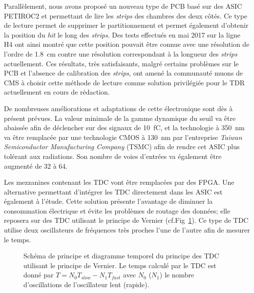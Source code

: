 Parallèlement, nous avons proposé un nouveau type de PCB basé sur des ASIC PETIROC2 et permettant de lire les \textit{strips} des chambres des deux côtés. Ce type de lecture permet de supprimer le partitionnement et permet également d'obtenir la position du \textit{hit} le long des \textit{strips}. Des tests effectués en mai \num{2017} sur la ligne H4 ont ainsi montré que cette position pouvait être connue avec une résolution de l'ordre de \SI{1.8}{\centi\meter} contre une résolution correspondant à la longueur des \textit{strips} actuellement. Ces résultats, très satisfaisants, malgré certains problèmes sur le PCB et l'absence de calibration des \textit{strips}, ont amené la communauté muons de CMS à choisir cette méthode de lecture comme solution privilégiée pour le TDR actuellement en cours de rédaction.

De nombreuses améliorations et adaptations de cette électronique sont dès à présent prévues. La valeur minimale de la gamme dynamique du seuil va être abaissée afin de déclencher sur des signaux de \SI{10}{\femto\coulomb}, et la technologie  à \SI{350}{\nano\meter} va être remplacée par une technologie CMOS à \SI{130}{\nano\meter} par l'entreprise \textit{Taiwan Semiconductor Manufacturing Company} (TSMC) afin de rendre cet ASIC plus tolérant aux radiations. Son nombre de voies d'entrées va également être augmenté de \num{32} à \num{64}.

Les mezzanines contenant les TDC vont être remplacées par des FPGA. Une alternative permettant d'intégrer les TDC directement dans les ASIC est également à l'étude. Cette solution présente l'avantage de diminuer la consommation électrique et évite les problèmes de routage des données; elle reposera sur des TDC utilisant le principe de Vernier (cf.Fig~\ref{vernier}). Ce type de TDC utilise deux oscillateurs de fréquences très proches l'une de l'autre afin de mesurer le temps.

\begin{figure}[ht!]
	\centering
	\hfill
	\caption{Schéma de principe et diagramme temporel du principe des TDC utilisant le principe de Vernier. Le temps calculé par le TDC est donné par $T=N_0T_{slow}-N_1T_{fast}$ avec $N_0$ ($N_1$) le nombre d'oscillations de l'oscillateur lent (rapide).}
	\label{vernier}
\end{figure}

